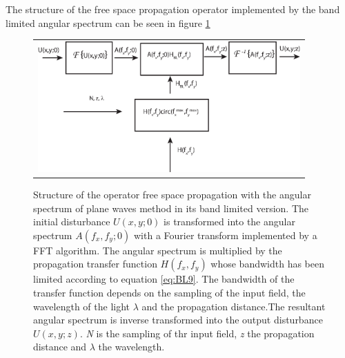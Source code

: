  The structure of the free space propagation operator implemented by the band limited angular spectrum can be seen in figure \ref{fig:BLAS} 
 \newpage
 \begin{figure}[H]
 	\begin{center}
 		\begin{tabular}{c}
 			\includegraphics[height=5cm]{asfluxBL.eps}
 		\end{tabular}
 	\end{center}
 	\caption	{ \label{fig:BLAS} 
 		Structure of the operator free space propagation with the angular spectrum of plane waves method in its band limited version. The initial disturbance $U(x,y;0)$ is transformed into the angular spectrum $A(f_x,f_y;0)$ with a Fourier transform implemented by a FFT algorithm. The angular spectrum is multiplied by the propagation transfer function $H(f_x,f_y)$ whose bandwidth has been limited according to equation \ref{eq:BL9}. The bandwidth of the transfer function depends on the sampling of the input field, the wavelength of the light $\lambda$ and the propagation distance.The resultant angular spectrum is inverse transformed into the output disturbance $U(x,y;z)$. \textit{N} is the sampling of thr input field, \textit{z} the propagation distance and $\lambda$ the wavelength. }
 \end{figure} 
